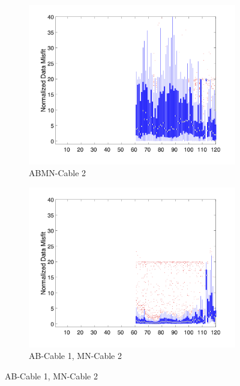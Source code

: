 \documentclass[final,authoryear,5p,times,twocolumn]{elsarticle}
\begin{document}
\begin{figure}[!ht]
   \vspace{1em}

   \begin{subfigure}[b]{0.475\linewidth}
       \centering
       \includegraphics[trim=1.6cm 1.7cm 2cm 1.3cm, clip=true, width=\linewidth]{./Figures/Fig8c.png}
       \caption{ABMN-Cable 2}
       \label{fig:Boxplot_ABMN_Cable2_Misfit_vs_M_ElecID}
   \end{subfigure}
   \hfill
   \begin{subfigure}[b]{0.475\linewidth}
       \centering
       \includegraphics[trim=1.6cm 1.7cm 2cm 1.3cm, clip=true, width=\linewidth]{./Figures/Fig8d.png}
       \caption{AB-Cable 1, MN-Cable 2}
       \label{fig:Boxplot_AB_Cable1_MN_Cable2_Misfit_vs_M_ElecID}
   \end{subfigure}


\end{figure}
\end{document}
